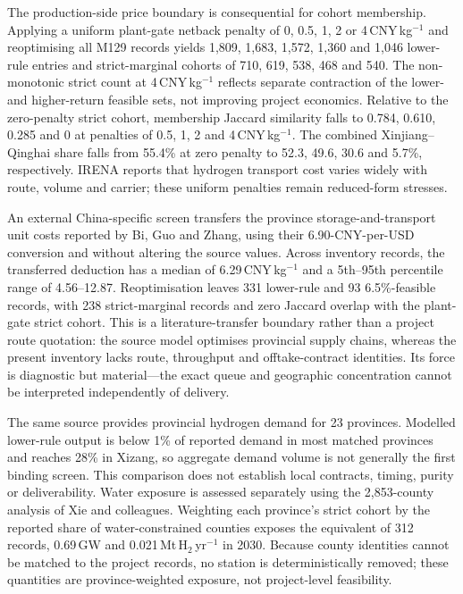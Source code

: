 \documentclass[pdflatex,sn-nature]{sn-jnl}
\begin{document}
The production-side price boundary is consequential for cohort membership. Applying a uniform plant-gate netback penalty of 0, 0.5, 1, 2 or 4\,CNY\,kg$^{-1}$ and reoptimising all M129 records yields 1,809, 1,683, 1,572, 1,360 and 1,046 lower-rule entries and strict-marginal cohorts of 710, 619, 538, 468 and 540. The non-monotonic strict count at 4\,CNY\,kg$^{-1}$ reflects separate contraction of the lower- and higher-return feasible sets, not improving project economics. Relative to the zero-penalty strict cohort, membership Jaccard similarity falls to 0.784, 0.610, 0.285 and 0 at penalties of 0.5, 1, 2 and 4\,CNY\,kg$^{-1}$. The combined Xinjiang--Qinghai share falls from 55.4\% at zero penalty to 52.3, 49.6, 30.6 and 5.7\%, respectively. IRENA reports that hydrogen transport cost varies widely with route, volume and carrier; these uniform penalties remain reduced-form stresses\cite{irenatransport2022}.

An external China-specific screen transfers the province storage-and-transport unit costs reported by Bi, Guo and Zhang, using their 6.90-CNY-per-USD conversion and without altering the source values\cite{bi2026}. Across inventory records, the transferred deduction has a median of 6.29\,CNY\,kg$^{-1}$ and a 5th--95th percentile range of 4.56--12.87. Reoptimisation leaves 331 lower-rule and 93 6.5\%-feasible records, with 238 strict-marginal records and zero Jaccard overlap with the plant-gate strict cohort. This is a literature-transfer boundary rather than a project route quotation: the source model optimises provincial supply chains, whereas the present inventory lacks route, throughput and offtake-contract identities. Its force is diagnostic but material---the exact queue and geographic concentration cannot be interpreted independently of delivery.

The same source provides provincial hydrogen demand for 23 provinces. Modelled lower-rule output is below 1\% of reported demand in most matched provinces and reaches 28\% in Xizang, so aggregate demand volume is not generally the first binding screen. This comparison does not establish local contracts, timing, purity or deliverability. Water exposure is assessed separately using the 2,853-county analysis of Xie and colleagues\cite{xie2026}. Weighting each province's strict cohort by the reported share of water-constrained counties exposes the equivalent of 312 records, 0.69\,GW and 0.021\,Mt\,H$_2$\,yr$^{-1}$ in 2030. Because county identities cannot be matched to the project records, no station is deterministically removed; these quantities are province-weighted exposure, not project-level feasibility.
\end{document}
